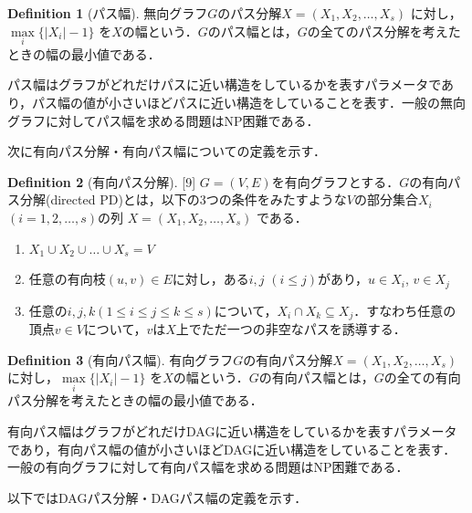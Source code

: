 \documentclass[master]{kuisthesis}		%
\theoremstyle{plain}
\theoremstyle{definition}
\newtheorem{definition*}{Definition}
\begin{document}
\begin{definition*}[パス幅]
    無向グラフ$G$のパス分解$X=(X_1, X_2,   \dots, X_s)$ に対し，$ \underset{i}{\max} \{ |X_i|-1 \}$ を$X$の幅という．$G$のパス幅とは，$G$の全てのパス分解を考えたときの幅の最小値である．
\end{definition*}

パス幅はグラフがどれだけパスに近い構造をしているかを表すパラメータであり，パス幅の値が小さいほどパスに近い構造をしていることを表す．一般の無向グラフに対してパス幅を求める問題はNP困難である．




 
次に有向パス分解・有向パス幅についての定義を示す．

\begin{definition*}[有向パス分解][9]
    $G=(V, E)$を有向グラフとする．$G$の有向パス分解(directed PD)とは，以下の3つの条件をみたすような$V$の部分集合$X_i$ $(i = 1, 2,  \dots, s)$の列 $X=(X_1, X_2,  \dots, X_s)$ である．
    
    \begin{enumerate}
        \item $ X_1 \cup X_2 \cup \dots \cup X_s = V $ 
        \item 任意の有向枝$(u, v) \in E$に対し，ある$i, j$ $(i \leq j)$があり，$u \in X_i$, $v \in X_j$
        \item 任意の$ i, j, k (1 \leq i \leq j \leq k \leq s)$について，$X_i \cap X_k \subseteq X_j$．すなわち任意の頂点$v \in V$について，$v$は$X$上でただ一つの非空なパスを誘導する．
    \end{enumerate}
\end{definition*}


\begin{definition*}[有向パス幅]
    有向グラフ$G$の有向パス分解$X=(X_1, X_2,   \dots, X_s)$に対し，$ \underset{i}{\max} \{ |X_i|-1 \}$ を$X$の幅という．$G$の有向パス幅とは，$G$の全ての有向パス分解を考えたときの幅の最小値である．
\end{definition*}

有向パス幅はグラフがどれだけDAGに近い構造をしているかを表すパラメータであり，有向パス幅の値が小さいほどDAGに近い構造をしていることを表す．一般の有向グラフに対して有向パス幅を求める問題はNP困難である．






以下ではDAGパス分解・DAGパス幅の定義を示す．
\end{document}
